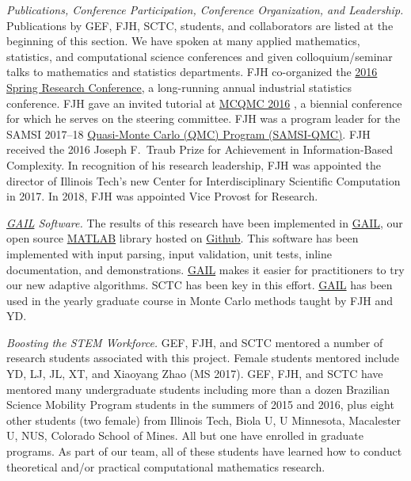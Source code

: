 \documentclass[11pt]{NSFamsart}
\newcommand{\GAIL}{\hyperlink{GAILlink}{GAIL}\xspace}
\newcommand{\MATLAB}{\hyperlink{MATLABlink}{MATLAB}\xspace}
\newcommand{\Rlang}{\hyperlink{Rlink}{R}\xspace}
\begin{document}
\emph{Publications, Conference Participation, Conference Organization, and Leadership.} Publications by GEF, FJH,  SCTC, students, and collaborators are listed at the beginning of this section.  We have spoken at many applied mathematics, statistics, 
and computational science conferences and given colloquium/seminar talks to mathematics and 
statistics departments.  FJH co-organized the 
\href{http://cos.iit.edu/2016-spring-research-conference/}{2016 Spring Research 
Conference}, a long-running annual industrial statistics conference.   FJH gave an invited tutorial
at \href{http://mcqmc2016.stanford.edu}{MCQMC 2016} 
\cite{Hic17a}, a biennial conference for which he serves on the steering committee.  FJH 
was a program leader for the SAMSI 2017--18 
\href{https://www.samsi.info/programs-and-activities/year-long-research-programs/2017-18-program-quasi-monte-carlo-high-dimensional-sampling-methods-applied-mathematics-qmc/
}{Quasi-Monte Carlo (QMC) Program (\hypertarget{SAMSIlink}{SAMSI-QMC})}.   FJH received the 2016 Joseph F.\ Traub Prize for Achievement in Information-Based Complexity. In recognition of his research leadership, FJH was appointed the director of Illinois Tech's new Center for Interdisciplinary 
Scientific Computation in 2017.  In 2018, FJH was appointed Vice Provost for Research.

	
\emph{\GAIL Software.} The results of this research have been implemented in 
\GAIL, our open source \MATLAB library hosted on
\href{http://gailgithub.github.io/GAIL_Dev/} {Github}. This software 
has been implemented with input parsing, input validation, unit tests, inline documentation, and 
demonstrations.  \GAIL makes it easier for practitioners to try our new adaptive algorithms.  SCTC has been key in this effort.  \GAIL has been used in the yearly graduate course in Monte Carlo methods taught by FJH and YD.  

\emph{Boosting the STEM Workforce.} GEF, FJH, and SCTC mentored a number of 
research students associated with this project.  Female students mentored include YD, LJ, JL, XT, and Xiaoyang Zhao (MS 2017).   GEF, FJH,  and SCTC have mentored many undergraduate students including more than a dozen 
Brazilian Science Mobility Program students in the summers of 2015 and 2016, plus eight other students (two female) from Illinois Tech, Biola U, U Minnesota, Macalester U, NUS, Colorado School of Mines.  All but one have enrolled in graduate programs.   As part of our team, all of
these students have learned how to conduct theoretical and/or practical computational mathematics research.
\end{document}
